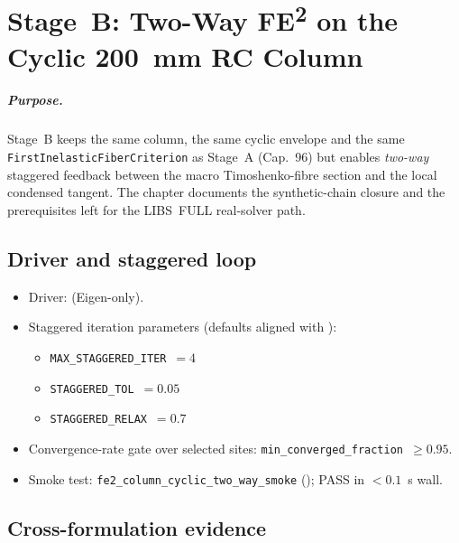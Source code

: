 
\chapter{Stage~B: Two-Way FE\textsuperscript{2} on the Cyclic 200~mm RC Column}
\label{ch:fe2-column-two-way}

\paragraph{Purpose.}
Stage~B keeps the same column, the same cyclic envelope and the same
\texttt{FirstInelasticFiberCriterion} as Stage~A (Cap.~96) but enables
\emph{two-way} staggered feedback between the macro Timoshenko-fibre
section and the local condensed tangent. The chapter documents the
synthetic-chain closure and the prerequisites left for the LIBS~FULL
real-solver path.

\section{Driver and staggered loop}

\begin{itemize}
  \item Driver: 
        (Eigen-only).
  \item Staggered iteration parameters (defaults aligned with
        ):
        \begin{itemize}
          \item \texttt{MAX\_STAGGERED\_ITER}~$= 4$
          \item \texttt{STAGGERED\_TOL}~$= 0.05$
          \item \texttt{STAGGERED\_RELAX}~$= 0.7$
        \end{itemize}
  \item Convergence-rate gate over selected sites:
        \texttt{min\_converged\_fraction}~$\ge 0.95$.
  \item Smoke test: \texttt{fe2\_column\_cyclic\_two\_way\_smoke}
        (); PASS
        in $<0.1$~s wall.
\end{itemize}

\section{Cross-formulation evidence}


